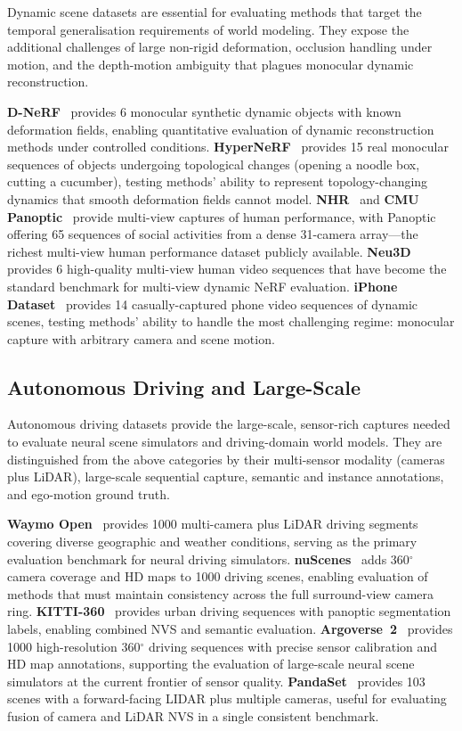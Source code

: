 Dynamic scene datasets are essential for evaluating methods that target
the temporal generalisation requirements of world modeling.
They expose the additional challenges of large non-rigid deformation,
occlusion handling under motion, and the depth-motion ambiguity that
plagues monocular dynamic reconstruction.

\textbf{D-NeRF}~\citep{pumarola2021dnerf} provides 6 monocular synthetic
dynamic objects with known deformation fields, enabling quantitative
evaluation of dynamic reconstruction methods under controlled conditions.
\textbf{HyperNeRF}~\citep{park2021hypernerf} provides 15 real monocular sequences
of objects undergoing topological changes (opening a noodle box, cutting a
cucumber), testing methods' ability to represent topology-changing dynamics
that smooth deformation fields cannot model.
\textbf{NHR}~\citep{wu2020nhr} and \textbf{CMU Panoptic}~\citep{joo2015panoptic}
provide multi-view captures of human performance, with Panoptic offering 65
sequences of social activities from a dense 31-camera array---the richest
multi-view human performance dataset publicly available.
\textbf{Neu3D}~\citep{li2022neural3d} provides 6 high-quality multi-view
human video sequences that have become the standard benchmark for
multi-view dynamic NeRF evaluation.
\textbf{iPhone Dataset}~\citep{guo2022neural} provides 14 casually-captured
phone video sequences of dynamic scenes, testing methods' ability to handle
the most challenging regime: monocular capture with arbitrary camera and
scene motion.

\subsection{Autonomous Driving and Large-Scale}

Autonomous driving datasets provide the large-scale, sensor-rich captures
needed to evaluate neural scene simulators and driving-domain world models.
They are distinguished from the above categories by their multi-sensor
modality (cameras plus LiDAR), large-scale sequential capture,
semantic and instance annotations, and ego-motion ground truth.

\textbf{Waymo Open}~\citep{sun2020waymo} provides 1000 multi-camera plus LiDAR
driving segments covering diverse geographic and weather conditions, serving as
the primary evaluation benchmark for neural driving simulators.
\textbf{nuScenes}~\citep{caesar2020nuscenes} adds 360$^\circ$ camera coverage
and HD maps to 1000 driving scenes, enabling evaluation of methods that
must maintain consistency across the full surround-view camera ring.
\textbf{KITTI-360}~\citep{liao2022kitti360} provides urban driving sequences
with panoptic segmentation labels, enabling combined NVS and semantic evaluation.
\textbf{Argoverse~2}~\citep{wilson2023argoverse2} provides 1000 high-resolution
360$^\circ$ driving sequences with precise sensor calibration and HD map
annotations, supporting the evaluation of large-scale neural scene simulators
at the current frontier of sensor quality.
\textbf{PandaSet}~\citep{xiao2021pandaset} provides 103 scenes with a
forward-facing LIDAR plus multiple cameras, useful for evaluating fusion of
camera and LiDAR NVS in a single consistent benchmark.

